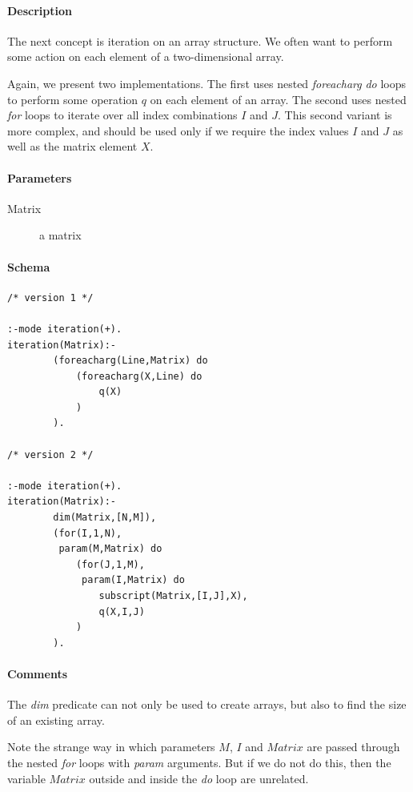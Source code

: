 \documentclass[a4paper,12pt]{report}
\begin{document}
\paragraph{Description}
The next concept is iteration on an array structure. We often want to perform some action on each element of a two-dimensional array. 

Again, we present two implementations. The first uses nested {\it foreacharg} {\it do} loops to perform some operation $q$ on each element of an array. The second uses nested {\it for} loops to iterate over all index combinations $I$ and $J$. This second variant is more complex, and should be used only if we require the index values $I$ and $J$ as well as the matrix element $X$. 
\paragraph{Parameters}
\begin{description}
\item[Matrix] a matrix
\end{description}
\paragraph{Schema}
\begin{verbatim}
/* version 1 */

:-mode iteration(+).
iteration(Matrix):-
        (foreacharg(Line,Matrix) do
            (foreacharg(X,Line) do
                q(X)
            )
        ).

/* version 2 */

:-mode iteration(+).
iteration(Matrix):-
        dim(Matrix,[N,M]),
        (for(I,1,N),
         param(M,Matrix) do
            (for(J,1,M),
             param(I,Matrix) do
                subscript(Matrix,[I,J],X),
                q(X,I,J)
            )
        ).
\end{verbatim}
\paragraph{Comments}
The {\it dim} predicate can not only be used to create arrays, but also to find the size of an existing array. 

Note the strange way in which parameters $M$, $I$ and $Matrix$ are passed through the nested {\it for} loops with {\it param} arguments. But if we do not do this, then the variable $Matrix$ outside and inside the {\it do} loop are unrelated.
\end{document}
